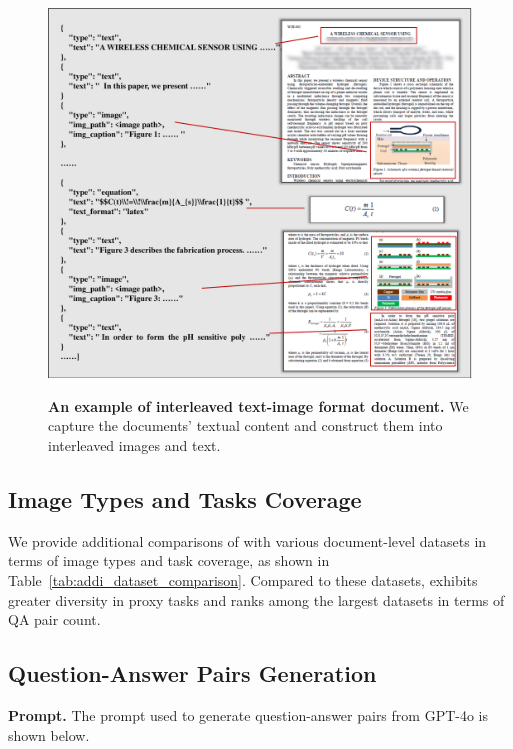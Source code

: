 


\begin{figure}[t]
    \centering
    \small
    {\includegraphics[width=.95\linewidth]{figure/interleaved_example.pdf}}
    \caption{
    \textbf{An example of interleaved text-image format document.} We capture the documents' textual content and construct them into interleaved images and text. 
    }
    \label{fig:interleaved-image_text}
\end{figure}


\subsection{Image Types and Tasks Coverage}
We provide additional comparisons of \dataname with various document-level datasets in terms of image types and task coverage, as shown in Table~\ref{tab:addi_dataset_comparison}. Compared to these datasets, \dataname exhibits greater diversity in proxy tasks and ranks among the largest datasets in terms of QA pair count.



\subsection{Question-Answer Pairs Generation}
\noindent\textbf{Prompt.} The prompt used to generate question-answer pairs from GPT-4o is shown below.

